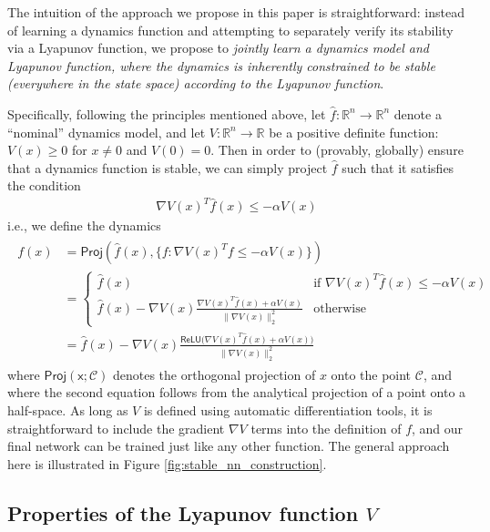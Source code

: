 The intuition of the approach we propose in this paper is straightforward: instead of learning a dynamics function and attempting to separately verify its stability via a Lyapunov function, we propose to \emph{jointly learn a dynamics model and Lyapunov function, where the dynamics is inherently constrained to be stable (everywhere in the state space) according to the Lyapunov function}.

Specifically, following the principles mentioned above, let $\hat{f} : \mathbb{R}^n \rightarrow \mathbb{R}^n$ denote a ``nominal'' dynamics model, and let $V : \mathbb{R}^n \rightarrow \mathbb{R}$ be a positive definite function: $V(x) \geq 0$ for $x \neq 0$ and $V(0) = 0$.  Then in order to (provably, globally) ensure that a dynamics function is stable, we can simply project $\hat{f}$ such that it satisfies the condition
\begin{align}
	\nabla V(x)^T \hat{f}(x) \leq -\alpha V(x)
\end{align}
i.e., we define the dynamics
\begin{align}
	\label{eq:dynamics}
	\begin{split}
		f(x) & =  \mathsf{Proj}\left(\hat{f}(x), \{f: \nabla V(x)^T f \leq -\alpha V(x)\}\right) \\
		& = \begin{cases} \hat{f}(x) & \mbox{if } \nabla V(x)^T \hat{f}(x) \leq -\alpha V(x) \\
              \hat{f}(x) - \nabla V(x)\frac{\nabla V(x)^T \hat{f}(x) + \alpha V (x)}{\|\nabla V(x)\|_2^2}
                         & \mbox{otherwise}\end{cases} \\
		& = \hat{f}(x) - \nabla V(x)\frac{\mathsf{ReLU}\bigl(\nabla V(x)^T \hat{f}(x) + \alpha V (x) \bigr)}{\|\nabla V(x)\|_2^2}
	\end{split}
\end{align}
where $\mathsf{Proj(x;\mathcal{C})}$ denotes the orthogonal projection of $x$ onto the point $\mathcal{C}$, and where the second equation follows from the analytical projection of a point onto a half-space.  As long as $V$ is defined using automatic differentiation tools, it is straightforward to include the gradient $\nabla V$ terms into the definition of $f$, and our final network can be trained just like any other function.   The general approach here is illustrated in Figure \ref{fig:stable_nn_construction}.



\subsection{Properties of the Lyapunov function $V$}\label{sec:lyapunov_properties}

